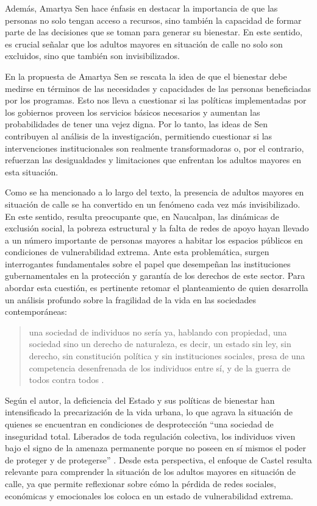\documentclass[
  spanish,
  11pt,
  a4paper,
]{scrbook}
\begin{document}
Además, Amartya Sen hace énfasis en destacar la importancia de que las
personas no solo tengan acceso a recursos, sino también la capacidad de
formar parte de las decisiones que se toman para generar su bienestar.
En este sentido, es crucial señalar que los adultos mayores en situación
de calle no solo son excluidos, sino que también son invisibilizados.

En la propuesta de Amartya Sen se rescata la idea de que el bienestar
debe medirse en términos de las necesidades y capacidades de las
personas beneficiadas por los programas. Esto nos lleva a cuestionar si
las políticas implementadas por los gobiernos proveen los servicios
básicos necesarios y aumentan las probabilidades de tener una vejez
digna. Por lo tanto, las ideas de Sen contribuyen al análisis de la
investigación, permitiendo cuestionar si las intervenciones
institucionales son realmente transformadoras o, por el contrario,
refuerzan las desigualdades y limitaciones que enfrentan los adultos
mayores en esta situación.

Como se ha mencionado a lo largo del texto, la presencia de adultos
mayores en situación de calle se ha convertido en un fenómeno cada vez
más invisibilizado. En este sentido, resulta preocupante que, en
Naucalpan, las dinámicas de exclusión social, la pobreza estructural y
la falta de redes de apoyo hayan llevado a un número importante de
personas mayores a habitar los espacios públicos en condiciones de
vulnerabilidad extrema. Ante esta problemática, surgen interrogantes
fundamentales sobre el papel que desempeñan las instituciones
gubernamentales en la protección y garantía de los derechos de este
sector. Para abordar esta cuestión, es pertinente retomar el
planteamiento de \textcite{Castel2004} quien desarrolla un análisis
profundo sobre la fragilidad de la vida en las sociedades
contemporáneas:

\begin{quote}
una sociedad de individuos no sería ya, hablando con propiedad, una
sociedad sino un derecho de naturaleza, es decir, un estado sin ley, sin
derecho, sin constitución política y sin instituciones sociales, presa
de una competencia desenfrenada de los individuos entre sí, y de la
guerra de todos contra todos \autocite[19]{Castel2004}.
\end{quote}

Según el autor, la deficiencia del Estado y sus políticas de bienestar
han intensificado la precarización de la vida urbana, lo que agrava la
situación de quienes se encuentran en condiciones de desprotección ``una
sociedad de inseguridad total. Liberados de toda regulación colectiva,
los individuos viven bajo el signo de la amenaza permanente porque no
poseen en sí mismos el poder de proteger y de protegerse''
\autocite[19]{Castel2004}. Desde esta perspectiva, el enfoque de Castel
resulta relevante para comprender la situación de los adultos mayores en
situación de calle, ya que permite reflexionar sobre cómo la pérdida de
redes sociales, económicas y emocionales los coloca en un estado de
vulnerabilidad extrema.
\end{document}
